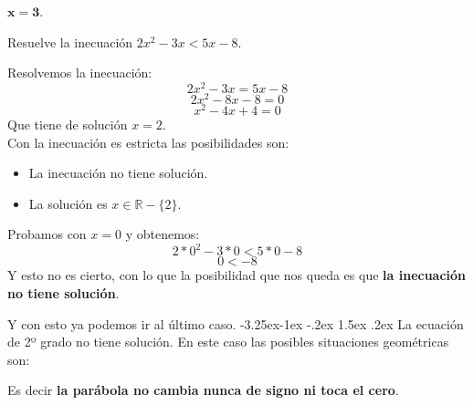 \documentclass[a4paper,11pt,answers]{exam}
\makeatletter
\newcommand{\realset}{\mathbb{R}}
\renewcommand\paragraph{\@startsection{paragraph}{4}{\z@}%
                                     {-3.25ex\@plus -1ex \@minus -.2ex}%
                                     {1.5ex \@plus .2ex}%
                                     {\normalfont\normalsize\bfseries}}
\makeatother
\begin{document}
\begin{questions}
\begin{solution}
{    $\boldsymbol{x = 3}$}.
  \end{solution}
\question Resuelve la inecuación $2x^2 - 3 x < 5x -8$.
  \begin{solution}
    Resolvemos la inecuación:
    \[2x^2 - 3x = 5x - 8\]
    \[2x^2 - 8 x - 8 = 0\]
    \[x^2 - 4x + 4 = 0\]
    Que tiene de solución $x = 2$.\\
    Con la inecuación es estricta las posibilidades son:
    \begin{itemize}
    \item La inecuación no tiene solución.
    \item La solución es $x \in \realset - \{2\}$.
    \end{itemize}
    Probamos con $x = 0$ y obtenemos:
    \[2*0^2 - 3*0 < 5*0 - 8\]
    \[0 < -8\]
    Y esto no es cierto, con lo que la posibilidad que nos queda es que \textbf{la inecuación no
      tiene solución}.
  \end{solution}
\end{questions}

Y con esto ya podemos ir al último caso.
\paragraph{La ecuación de 2º grado no tiene solución.}
En este caso las posibles situaciones geométricas son:
\begin{center}
  \quad\quad\quad
\end{center}
Es decir \textbf{la parábola no cambia nunca de signo ni toca el cero}.\\
\end{document}
